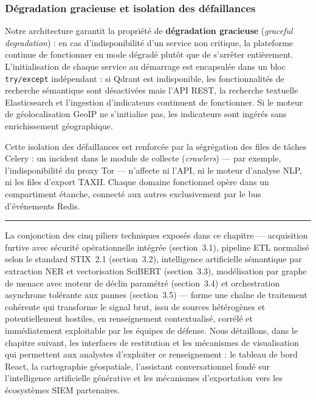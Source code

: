 \subsubsection{Dégradation gracieuse et isolation des défaillances}

Notre architecture garantit la propriété de \textbf{dégradation gracieuse} (\textit{graceful degradation}) : en cas d'indisponibilité d'un service non critique, la plateforme continue de fonctionner en mode dégradé plutôt que de s'arrêter entièrement. L'initialisation de chaque service au démarrage est encapsulée dans un bloc \texttt{try/except} indépendant : si Qdrant est indisponible, les fonctionnalités de recherche sémantique sont désactivées mais l'API REST, la recherche textuelle Elasticsearch et l'ingestion d'indicateurs continuent de fonctionner. Si le moteur de géolocalisation GeoIP ne s'initialise pas, les indicateurs sont ingérés sans enrichissement géographique.

Cette isolation des défaillances est renforcée par la ségrégation des files de tâches Celery : un incident dans le module de collecte (\textit{crawlers}) --- par exemple, l'indisponibilité du proxy Tor --- n'affecte ni l'API, ni le moteur d'analyse NLP, ni les files d'export TAXII. Chaque domaine fonctionnel opère dans un compartiment étanche, connecté aux autres exclusivement par le bus d'événements Redis.

\bigskip
\noindent\rule{\textwidth}{0.4pt}
\bigskip

La conjonction des cinq piliers techniques exposés dans ce chapitre --- acquisition furtive avec sécurité opérationnelle intégrée (section~3.1), pipeline ETL normalisé selon le standard STIX~2.1 (section~3.2), intelligence artificielle sémantique par extraction NER et vectorisation SciBERT (section~3.3), modélisation par graphe de menace avec moteur de déclin paramétré (section~3.4) et orchestration asynchrone tolérante aux pannes (section~3.5) --- forme une chaîne de traitement cohérente qui transforme le signal brut, issu de sources hétérogènes et potentiellement hostiles, en renseignement contextualisé, corrélé et immédiatement exploitable par les équipes de défense. Nous détaillons, dans le chapitre suivant, les interfaces de restitution et les mécanismes de visualisation qui permettent aux analystes d'exploiter ce renseignement : le tableau de bord React, la cartographie géospatiale, l'assistant conversationnel fondé sur l'intelligence artificielle générative et les mécanismes d'exportation vers les écosystèmes SIEM partenaires.
